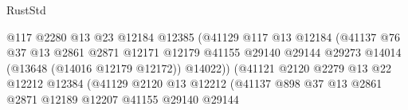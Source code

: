 \begin{lexlean}{RustStd}
\begin{coremodule}
                                              @117
                                              @2280
                                              @13
                                              @23
                                              @12184
                                              @12385
                                              (@41129
                                                @117
                                                @13
                                                @12184
                                                (@41137
                                                  @76
                                                  @37
                                                  @13
                                                  @2861
                                                  @2871
                                                  @12171
                                                  @12179
                                                  @41155
                                                  @29140
                                                  @29144
                                                  @29273
                                                  @14014
                                                  (@13648 (@14016 @12179 @12172))
                                                  @14022))
                                              (@41121
                                                @2120
                                                @2279
                                                @13
                                                @22
                                                @12212
                                                @12384
                                                (@41129
                                                  @2120
                                                  @13
                                                  @12212
                                                  (@41137
                                                    @898
                                                    @37
                                                    @13
                                                    @2861
                                                    @2871
                                                    @12189
                                                    @12207
                                                    @41155
                                                    @29140
                                                    @29144

\end{coremodule}
\end{lexlean}
